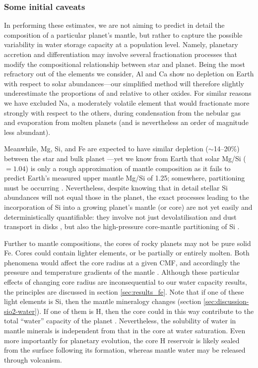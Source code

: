 \subsubsection{Some initial caveats}

In performing these estimates, we are not aiming to predict in detail the composition of a particular planet's mantle, but rather to capture the possible variability in water storage capacity at a population level. Namely, planetary accretion and differentiation may involve several fractionation processes that modify the compositional relationship between star and planet. Being the most refractory out of the elements we consider, Al and Ca show no depletion on Earth with respect to solar abundances---our simplified method will therefore slightly underestimate the proportions of  and  relative to other oxides. For similar reasons we have excluded Na, a moderately volatile element that would fractionate more strongly with respect to the others, during condensation from the nebular gas and evaporation from molten planets (and is nevertheless an order of magnitude less abundant). 

Meanwhile, Mg, Si, and Fe are expected to have similar depletion ($\sim$14--20\%) between the star and bulk planet \citep{wang_enhanced_2019}---yet we know from Earth that solar Mg/Si ($=1.04$) is only a rough approximation of mantle composition as it fails to predict Earth's measured upper mantle Mg/Si of 1.25; somewhere, partitioning must be occurring \citep[see also section \ref{sec:discussion-sio2-water}]{ringwood_significance_1989, mcdonough_composition_1995, lodders_abundances_2009}. Nevertheless, despite knowing that in detail stellar Si abundances will not equal those in the planet, the exact processes leading to the incorporation of Si into a growing planet's mantle (or core) are not yet easily and deterministically quantifiable: they involve not just devolatilisation and dust transport in disks \citep{miyazaki_dynamic_2020}, but also the high-pressure core-mantle partitioning of Si \citep{fischer_high_2015}.

Further to mantle compositions, the cores of rocky planets may not be pure solid Fe. Cores could contain lighter elements, or be partially or entirely molten. Both phenomena would affect the core radius at a given CMF, and accordingly the pressure and temperature gradients of the mantle \citep{unterborn_scaling_2016}. Although these particular effects of changing core radius are inconsequential to our water capacity results, the principles are discussed in section \ref{sec:results_fe}. Note that if one of these light elements is Si, then the mantle mineralogy changes (section \ref{sec:discussion-sio2-water}). If one of them is H, then the core could in this way contribute to the total ``water'' capacity of the planet \citep{shah_internal_2021}. Nevertheless, the solubility of water in mantle minerals is independent from that in the core at water saturation. Even more importantly for planetary evolution, the core H reservoir is likely sealed from the surface following its formation, whereas mantle water may be released through volcanism.




